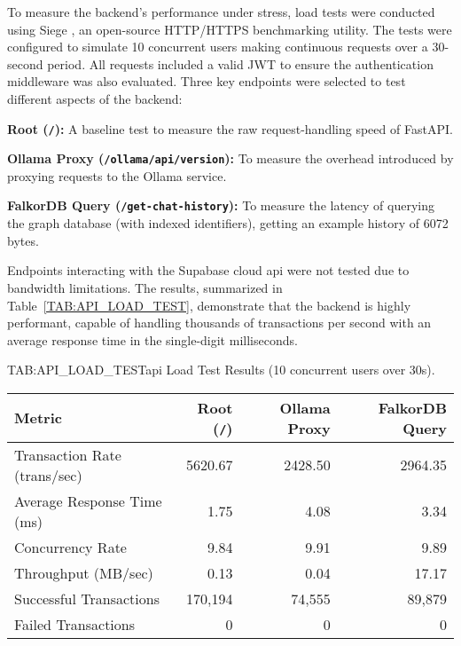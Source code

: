 To measure the backend's performance under stress, load tests were conducted using Siege \cite{SIEGE}, an open-source HTTP/HTTPS benchmarking utility. The tests were configured to simulate 10 concurrent users making continuous requests over a 30-second period. All requests included a valid JWT to ensure the authentication middleware was also evaluated. Three key endpoints were selected to test different aspects of the backend:

\begin{compactitem}[\textbullet]
    \item \textbf{Root (\texttt{/}):} A baseline test to measure the raw request-handling speed of FastAPI.
    \item \textbf{Ollama Proxy (\texttt{/ollama/api/version}):} To measure the overhead introduced by proxying requests to the Ollama service.
    \item \textbf{FalkorDB Query (\texttt{/get-chat-history}):} To measure the latency of querying the graph database (with indexed identifiers), getting an example history of 6072 bytes.
\end{compactitem}

Endpoints interacting with the Supabase cloud \acs{api} were not tested due to bandwidth limitations. The results, summarized in Table~\ref{TAB:API_LOAD_TEST}, demonstrate that the backend is highly performant, capable of handling thousands of transactions per second with an average response time in the single-digit milliseconds.

\begin{table}[Load Test Results]{TAB:API_LOAD_TEST}{\acs{api} Load Test Results (10 concurrent users over 30s).}
    \centering
    \begin{tabular}{l r r r}
        \hline
        \textbf{Metric} & \textbf{Root (\texttt{/})} & \textbf{Ollama Proxy} & \textbf{FalkorDB Query} \\
        \hline\hline
        Transaction Rate (trans/sec) & 5620.67 & 2428.50 & 2964.35 \\
        Average Response Time (ms) & 1.75 & 4.08 & 3.34 \\
        Concurrency Rate & 9.84 & 9.91 & 9.89 \\
        Throughput (MB/sec) & 0.13 & 0.04 & 17.17 \\
        Successful Transactions & 170,194 & 74,555 & 89,879 \\
        Failed Transactions & 0 & 0 & 0 \\
        \hline
    \end{tabular}
\end{table}